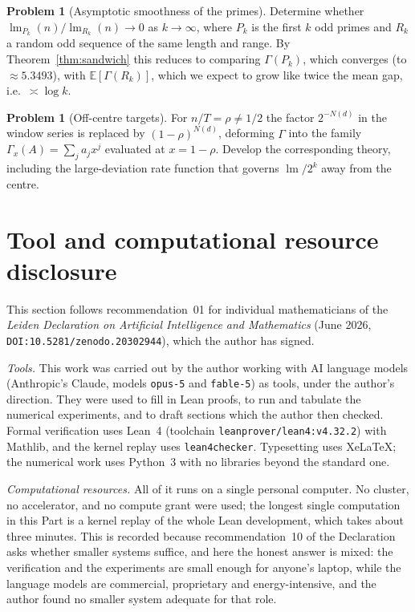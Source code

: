 \documentclass[11pt,a4paper]{article}
\theoremstyle{plain}
\theoremstyle{definition}
\newtheorem{problem}[theorem]{Problem}
\theoremstyle{remark}
\DeclareMathOperator{\lm}{lm}
\begin{document}
\begin{problem}[Asymptotic smoothness of the primes]\label{prob:primes}
Determine whether $\lm_{P_k}(n)/\lm_{R_k}(n)\to0$ as $k\to\infty$, where $P_k$
is the first $k$ odd primes and $R_k$ a random odd sequence of the same length
and range. By Theorem~\ref{thm:sandwich} this reduces to comparing
$\Gamma(P_k)$, which converges (to $\approx5.3493$), with
$\mathbb{E}[\Gamma(R_k)]$, which we expect to grow like twice the mean gap,
i.e.\ $\asymp\log k$.
\end{problem}

\begin{problem}[Off-centre targets]\label{prob:rho}
For $n/T=\rho\ne1/2$ the factor $2^{-N(d)}$ in the window series is replaced by
$(1-\rho)^{N(d)}$, deforming $\Gamma$ into the family
$\Gamma_x(A)=\sum_j a_jx^{j}$ evaluated at $x=1-\rho$. Develop the corresponding
theory, including the large-deviation rate function that governs $\lm/2^{k}$
away from the centre.
\end{problem}

\section*{Tool and computational resource disclosure}
This section follows recommendation~01 for individual mathematicians of the
\emph{Leiden Declaration on Artificial Intelligence and Mathematics} (June 2026,
\texttt{DOI:10.5281/zenodo.20302944}), which the author has signed.

\emph{Tools.} This work was carried out by the author working with AI language models
(Anthropic's Claude, models \texttt{opus-5} and \texttt{fable-5}) as tools, under the
author's direction. They were used to fill in Lean proofs, to run and tabulate the numerical
experiments, and to draft sections which the author then checked. Formal verification uses
Lean~4 (toolchain \texttt{leanprover/lean4:v4.32.2}) with Mathlib, and the kernel replay uses
\texttt{lean4checker}. Typesetting uses Xe\LaTeX{}; the numerical work uses Python~3 with no
libraries beyond the standard one.

\emph{Computational resources.} All of it runs on a single personal computer. No cluster, no
accelerator, and no compute grant were used; the longest single computation in this Part is a
kernel replay of the whole Lean development, which takes about three minutes. This is recorded
because recommendation~10 of the Declaration asks whether smaller systems suffice, and here the
honest answer is mixed: the verification and the experiments are small enough for anyone's
laptop, while the language models are commercial, proprietary and energy-intensive, and the
author found no smaller system adequate for that role.
\end{document}
